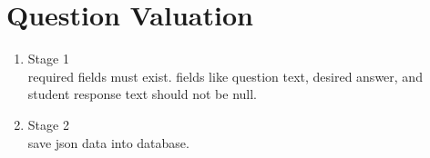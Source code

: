 \section{Question Valuation}

    \begin{enumerate}
        \item Stage 1 \\  required fields must exist. fields like question text, desired answer, and student response text should not be null. 
        \item Stage 2 \\ save json data into database.
    \end{enumerate}